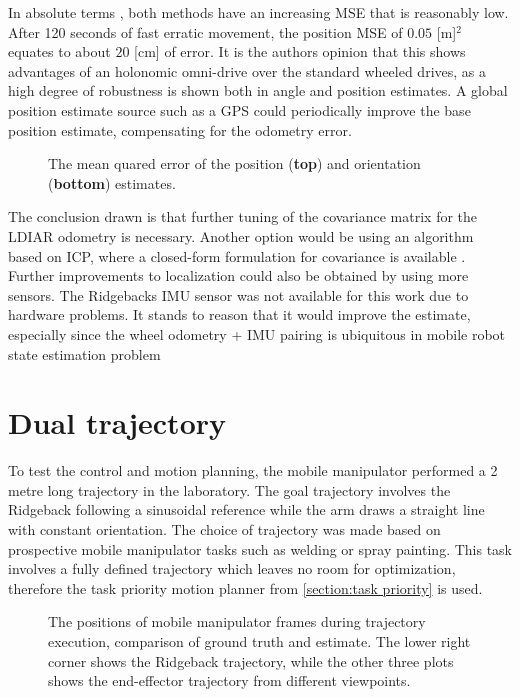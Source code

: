 \documentclass[times, utf8, diplomski, english]{fer}
\begin{document}
In absolute terms , both methods have an increasing MSE that is reasonably low. 
After 120 seconds of fast erratic movement, the position MSE of $0.05$ [m]$^2$ equates to about $20$ [cm] of error.
It is the authors opinion that this shows advantages of an holonomic omni-drive over the standard wheeled drives, as a high degree of robustness is shown both in angle and position estimates.
A global position estimate source such as a GPS could periodically improve the base position estimate, compensating for the odometry error.
\begin{figure}[h]
\centering

\caption{The mean quared error of the position (\textbf{top}) and orientation (\textbf{bottom}) estimates. }
\label{fig:mse_localization}
\end{figure}

The conclusion drawn is that further tuning of the covariance matrix for the LDIAR odometry is necessary.
Another option would be using an algorithm based on ICP, where a closed-form formulation for covariance is available \citep{censi2007accurate}.
Further improvements to localization could also be obtained by using more sensors. 
The Ridgebacks IMU sensor was not available for this work due to hardware problems.
It stands to reason that it would improve the estimate, especially since the wheel odometry + IMU pairing is ubiquitous in mobile robot state estimation problem 

\section{Dual trajectory}\label{section:dual trajectory}
To test the control and motion planning, the mobile manipulator performed a 2 metre long trajectory in the laboratory.
The goal trajectory involves the Ridgeback following a sinusoidal reference while the arm draws a straight line with constant orientation.
The choice of trajectory was made based on prospective mobile manipulator tasks such as welding or spray painting.
This task involves a fully defined trajectory which leaves no room for optimization, therefore the task priority motion planner from \ref{section:task priority} is used.
\begin{figure}[h]
\centering

\caption{The positions of mobile manipulator frames during trajectory execution, comparison of ground truth and estimate.
The lower right corner shows the Ridgeback trajectory, while the other three plots shows the end-effector trajectory from different viewpoints.}
\label{fig:dual_trajectory}
\end{figure}
\end{document}
